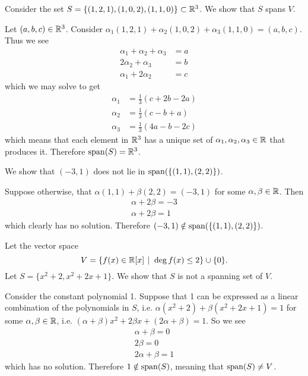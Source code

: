 \begin{example}
    Consider the set $S = \{(1, 2, 1), (1, 0, 2), (1, 1, 0)\} \subset \mathbb{R}^3$. We show that $S$ spans $V$.

    Let $(a, b, c) \in \mathbb{R}^3$. Consider $\alpha_1(1, 2, 1) + \alpha_2(1, 0, 2) + \alpha_3(1, 1, 0) = (a, b, c)$. Thus we see
    \begin{align*}
        \alpha_1 + \alpha_2 + \alpha_3 &= a\\
        2\alpha_2  + \alpha_3 &= b\\
        \alpha_1 + 2\alpha_2 &= c
    \end{align*}
    which we may solve to get
    \begin{align*}
        \alpha_1 &= \frac13(c + 2b - 2a)\\
        \alpha_2 &= \frac13(c - b + a)\\
        \alpha_3 &= \frac13(4a - b - 2c)
    \end{align*}
    which means that each element in $\mathbb{R}^3$ has a unique set of $\alpha_1, \alpha_2, \alpha_3 \in \mathbb{R}$ that produces it. Therefore $\mathrm{span}(S) = \mathbb{R}^3$.
\end{example}

\begin{example}
    We show that $(-3, 1)$ does not lie in $\mathrm{span}(\{(1,1), (2,2)\})$.

    Suppose otherwise, that $\alpha(1,1) + \beta(2,2) = (-3,1)$ for some $\alpha, \beta \in \mathbb{R}$. Then
    \begin{align*}
        \alpha + 2\beta = -3\\
        \alpha + 2\beta = 1
    \end{align*}
    which clearly has no solution. Therefore $(-3, 1) \notin \mathrm{span}(\{(1, 1), (2, 2)\})$.
\end{example}

\begin{example}
    Let the vector space
    \[
        V = \{f(x) \in \R[x] \vert \deg f(x) \leq 2\} \cup \{0\}.
    \]
    Let $S = \{x^2 + 2, x^2 + 2x + 1\}$. We show that $S$ is not a spanning set of $V$.

    Consider the constant polynomial 1. Suppose that 1 can be expressed as a linear combination of the polynomials in $S$, i.e. $\alpha(x^2 + 2) + \beta(x^2+2x+1) = 1$ for some $\alpha, \beta \in \mathbb{R}$, i.e. $(\alpha + \beta)x^2 + 2\beta x + (2\alpha + \beta) = 1$. So we see
    \begin{align*}
        \alpha + \beta = 0\\
        2\beta = 0\\
        2\alpha + \beta = 1
    \end{align*}
    which has no solution. Therefore $1 \notin \mathrm{span}(S)$, meaning that $\mathrm{span}(S) \neq V$.
\end{example}

